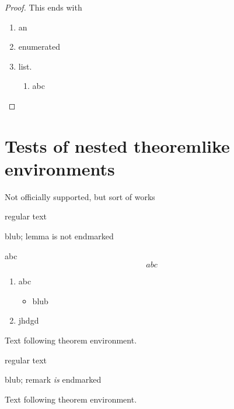 \documentclass[leqno]{article}
\begin{document}
\begin{proof}
  This ends with
  \begin{enumerate}
  \item an
  \item enumerated
  \item list.
  \begin{enumerate}
  \item abc
  \end{enumerate}
  \end{enumerate}
\end{proof}

\section{Tests of nested theoremlike environments}
Not officially supported, but sort of works

\begin{theorem}
  regular text
  \begin{lemma}
    blub; lemma is not endmarked
  \end{lemma}
  \begin{lemma}
    abc
    \begin{equation*}
      abc
    \end{equation*}
    \begin{enumerate}
    \item abc
      \begin{itemize}
      \item blub
      \end{itemize}
    \item jhdgd
    \end{enumerate}
  \end{lemma}
\end{theorem}

Text following theorem environment.
\emph{\color{gray}\kant*[1][1-2]}

\begin{theorem}
  regular text
  \begin{remark}
    blub; remark \emph{is} endmarked
  \end{remark}
\end{theorem}

Text following theorem environment.
\emph{\color{gray}\kant*[1][1-2]}
\end{document}
